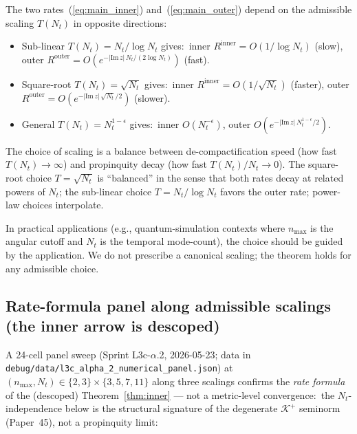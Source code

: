 \documentclass[11pt,a4paper]{article}
\theoremstyle{plain}
\theoremstyle{definition}
\newcommand{\nmax}{n_{\max}}
\newcommand{\Nt}{N_{t}}
\newcommand{\Krein}{\mathcal{K}}
\newcommand{\Kplus}{\Krein^{+}}
\begin{document}
The two rates~(\ref{eq:main_inner}) and~(\ref{eq:main_outer}) depend
on the admissible scaling $T(\Nt)$ in opposite directions:
\begin{itemize}
\item Sub-linear $T(\Nt) = \Nt/\log\Nt$ gives:\ inner
$R^{\mathrm{inner}} = O(1/\log\Nt)$ (slow), outer
$R^{\mathrm{outer}} = O(e^{-|\mathrm{Im}\,z|\,\Nt/(2\log\Nt)})$ (fast).
\item Square-root $T(\Nt) = \sqrt{\Nt}$ gives:\ inner
$R^{\mathrm{inner}} = O(1/\sqrt{\Nt})$ (faster), outer
$R^{\mathrm{outer}} = O(e^{-|\mathrm{Im}\,z|\,\sqrt{\Nt}/2})$ (slower).
\item General $T(\Nt) = \Nt^{1-\epsilon}$ gives:\ inner $O(\Nt^{-\epsilon})$,
outer $O(e^{-|\mathrm{Im}\,z|\,\Nt^{1-\epsilon}/2})$.
\end{itemize}
The choice of scaling is a balance between de-compactification speed
(how fast $T(\Nt) \to \infty$) and propinquity decay (how fast
$T(\Nt)/\Nt \to 0$). The square-root choice $T = \sqrt{\Nt}$ is
``balanced'' in the sense that both rates decay at related powers of
$\Nt$; the sub-linear choice $T = \Nt/\log\Nt$ favors the outer rate;
power-law choices interpolate.

In practical applications (e.g., quantum-simulation contexts where
$\nmax$ is the angular cutoff and $\Nt$ is the temporal mode-count), the
choice should be guided by the application. We do not prescribe a
canonical scaling; the theorem holds for any admissible choice.

\subsection{Rate-formula panel along admissible scalings (the inner
arrow is descoped)}\label{sec:numerical_panel}

A 24-cell panel sweep
(Sprint L3c-$\alpha$.2, 2026-05-23; data in
\texttt{debug/data/l3c\_alpha\_2\_numerical\_panel.json}) at
$(\nmax, \Nt) \in \{2, 3\} \times \{3, 5, 7, 11\}$ along three
scalings confirms the \emph{rate formula} of the (descoped)
Theorem~\ref{thm:inner} --- not a metric-level convergence:\ the
$\Nt$-independence below is the structural signature of the degenerate
$\Kplus$ seminorm (Paper~45), not a propinquity limit:
\end{document}
